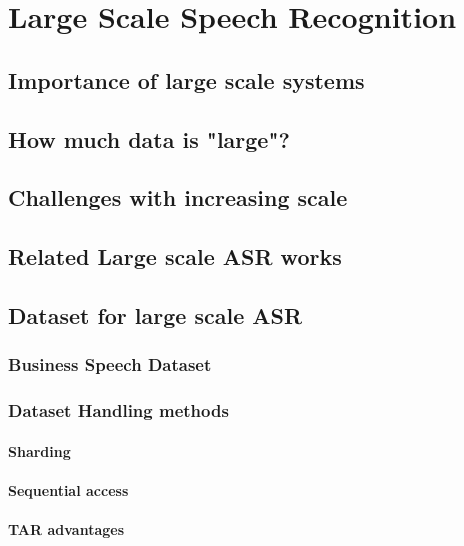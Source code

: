 \chapter{Large Scale Speech Recognition}
\label{chapter:largescale}

\section{Importance of large scale systems}
\section{How much data is "large"?}
\section{Challenges with increasing scale}
\section{Related Large scale ASR works}
\section{Dataset for large scale ASR}
\subsection{Business Speech Dataset}
\subsection{Dataset Handling methods}
\subsubsection{Sharding}
\subsubsection{Sequential access}
\subsubsection{TAR advantages}
